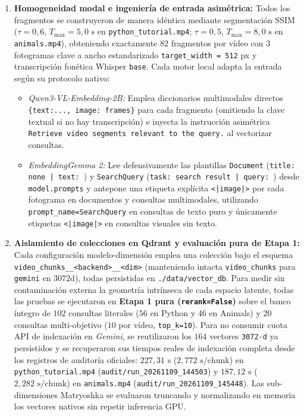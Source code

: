 \begin{enumerate}
    \item \textbf{Homogeneidad modal e ingeniería de entrada asimétrica:} Todos los fragmentos se construyeron de manera idéntica mediante segmentación SSIM ($\tau = 0,6$, $T_{\max} = 5,0\text{ s}$ en \texttt{python\_\allowbreak tutorial.mp4}; $\tau = 0,5$, $T_{\max} = 8,0\text{ s}$ en \texttt{animals.mp4}), obteniendo exactamente $82$ fragmentos por vídeo con $3$ fotogramas clave a ancho estandarizado \texttt{target\_width = 512} px y transcripción fonética Whisper \texttt{base}. Cada motor local adapta la entrada según su protocolo nativo:
    \begin{itemize}
        \item \textit{Qwen3-VL-Embedding-2B:} Emplea diccionarios multimodales directos \texttt{\{\textquotedbl text\textquotedbl:\allowbreak ...,\allowbreak~\textquotedbl image\textquotedbl:\allowbreak~frames\}} para cada fragmento (omitiendo la clave textual si no hay transcripción) e inyecta la instrucción asimétrica \texttt{\textquotedbl Retrieve video segments relevant to the query.\textquotedbl} al vectorizar consultas.
        \item \textit{EmbeddingGemma 2:} Lee defensivamente las plantillas \texttt{Document} (\texttt{\textquotedbl title: none | text: \textquotedbl}) y \texttt{SearchQuery} (\texttt{\textquotedbl task: search result | query: \textquotedbl}) desde \texttt{model.prompts} y antepone una etiqueta explícita \texttt{<|image|>} por cada fotograma en documentos y consultas multimodales, utilizando \texttt{prompt\_name=\allowbreak\textquotedbl SearchQuery\textquotedbl} en consultas de texto puro y únicamente etiquetas \texttt{<|image|>} en consultas visuales sin texto.
    \end{itemize}

    \item \textbf{Aislamiento de colecciones en Qdrant y evaluación pura de Etapa 1:} Cada configuración modelo-dimensión emplea una colección bajo el esquema \texttt{video\_\allowbreak chunks\_\_\allowbreak <backend>\_\_\allowbreak <dim>} (manteniendo intacta \texttt{video\_chunks} para \texttt{gemini} en $3072\text{d}$), todas persistidas en \texttt{./data/\allowbreak vector\_db}. Para medir sin contaminación externa la geometría intrínseca de cada espacio latente, todas las pruebas se ejecutaron en \textbf{Etapa 1 pura (\texttt{rerank=False})} sobre el banco íntegro de $102$ consultas literales ($56$ en Python y $46$ en Animals) y $20$ consultas multi-objetivo ($10$ por vídeo, \texttt{top\_k=10}). Para no consumir cuota API de indexación en \textit{Gemini}, se reutilizaron los $164$ vectores \texttt{3072-d} ya persistidos y se recuperaron sus tiempos reales de indexación completa desde los registros de auditoría oficiales: $227,31\text{ s}$ ($2,772\text{ s/chunk}$) en \texttt{python\_\allowbreak tutorial.mp4} (\texttt{audit/\allowbreak run\_20261109\_144503}) y $187,12\text{ s}$ ($2,282\text{ s/chunk}$) en \texttt{animals.mp4} (\texttt{audit/\allowbreak run\_20261109\_145448}). Las sub-dimensiones Matryoshka se evaluaron truncando y normalizando en memoria los vectores nativos sin repetir inferencia GPU.
\end{enumerate}

